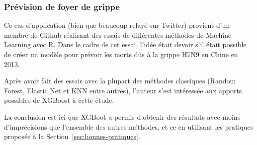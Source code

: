 \subsubsection{Prévision de foyer de grippe}
Ce cas d'application (bien que beaucoup relayé sur Twitter) provient d'un membre de Github réalisant des essais de différentes méthodes de Machine Learning avec R. Dans le cadre de cet essai, l'idée était devoir s'il était possible de créer un modèle pour prévoir les morts dûs à la grippe H7N9 en Chine en 2013.

Après avoir fait des essais avec la plupart des méthodes classiques (Random Forest, Elastic Net et KNN entre autres), l'auteur s'est intéressée aux apports possibles de XGBoost à cette étude.

La conclusion est ici que XGBoot a permis d'obtenir des résultats avec moins d'imprécisions que l'ensemble des autres méthodes, et ce en utilisant les pratiques proposée à la Section~\ref{sec:bonnes-pratiques}.

